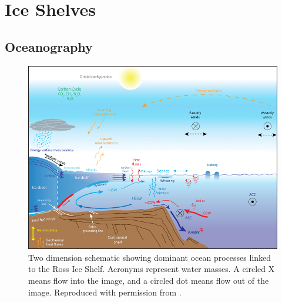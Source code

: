 \section{Ice Shelves} \label{ice_shelves}

\subsection{Oceanography} \label{oceanography}

\begin{figure}[!ht]
\centering
\includegraphics[width=1\textwidth]{chapters/1/ocean_schematic.png}
\caption[Ross Ice Shelf Circulation Schematic]{ Two dimension schematic showing dominant ocean processes linked to the Ross Ice Shelf. Acronyms represent water masses. A circled X means flow into the image, and a circled dot means flow out of the image.  Reproduced with permission from \cite{santis2018ross}. }
\label{fig:ocean_schematic}
\end{figure}  

